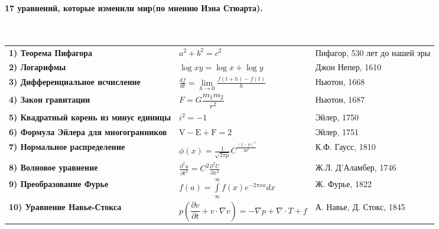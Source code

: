 \documentclass[10pt, a3paper]{scrartcl}
\begin{document}
\huge \textbf{17 уравнений, которые изменили мир(по мнению Иэна Стюарта).
		}
	\\
	\\ 
	\\
	\date{}
	\large
\begin{tabular}{p{8cm}  p{7cm} p{10cm}}   
   \textbf{1)   Теорема Пифагора}  &
 	  
 	   {$a^2+b^2=c^2$} & {Пифагор, 530 лет до нашей эры} \\
 
      \textbf{2)   Логарифмы} &
    
     {$\log xy = \log x + \log y$} & {Джон Непер, 1610} \\      
  
      \textbf{3)   Дифференциальное исчисление} &
       
   {$\frac{df}{dt} = \lim \limits_{h\to 0} \frac{f(t+h)-f(t)}{h}$} &  {Ньютон, 1668}\\
   
      \textbf{4)   Закон гравитации} &
     
     {$F = G\dfrac{m_{1} m_{2}}{r^2}$} & {Ньютон, 1687}\\
   
      \textbf{5)   Квадратный корень из
      	минус единицы} &
      {$i^{2} = -1$} &  {Эйлер, 1750}\\
    
      \textbf{6)   Формула Эйлера для
      	многогранников} &
      {$\mathrm{V}-\mathrm{E}+\mathrm{F}=2$} &  {Эйлер, 1751}\\
  
      \textbf{7)   Нормальное распределение} &
      {$\phi \left(x\right)=\frac{1}{\sqrt{2\pi p}}{C}^{\frac{{\left(x-p\right)}^{2}}{2{p}^{2}}}$} & {К.Ф. Гаусс, 1810} \\
  
      \textbf{8)   Волновое уравнение} &
      {$\frac{{\partial }^{2}u}{\partial {t}^{2}}={C}^{2}\frac{{\partial }^{2}U}{\partial {x}^{2}}$} & {Ж.Л. Д'Аламбер, 1746}\\     
   
      \textbf{9)   Преобразование Фурье} &
      {$f(a)=\underset{\infty }{\overset{\infty }{\int }}f\left(x\right){e}^{-2\pi xa}dx$}  &  {Ж. Фурье, 1822}\\
   
      \textbf{10)   Уравнение
      	Навье-Стокса} &
      {$p(\dfrac{\partial v}{\partial t}+ v \cdot \nabla v) = - \nabla p + \nabla \cdot T + f$}   & {А. Навье, Д. Стокс, 1845}\\
  

\end{tabular}
\end{document}
